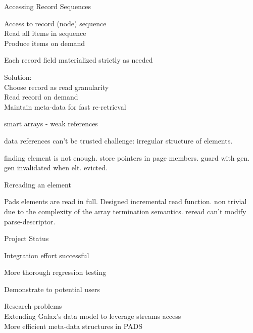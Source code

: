 \documentclass[landscape]{slides}
\begin{document}
\begin{Slide}{Accessing Record Sequences}

  \bb Access to record (node) sequence \\
  \bbb Read all items in sequence \\
  \bbb Produce items on demand

  \bb Each record field materialized strictly as needed

  \bb Solution: \\
  \bbb Choose record as read granularity \\
  \bbb Read record on demand \\
  \bbb Maintain meta-data for fast re-retrieval

\end{Slide}

\begin{Slide}{smart arrays - weak references}

  \bb data references can't be trusted
  \bb challenge: irregular structure of elements. 

    \bbb finding element is not enough.
    \bbb store pointers in page members.
    \bbb guard with gen.
    \bbb gen invalidated when elt. evicted.

\end{Slide}

\begin{Slide}{Rereading an element}

  \bb Pads elements are read in full.
  \bb Designed incremental read function.
  \bb non trivial due to the complexity of the array termination semantics.
  \bb reread can't modify parse-descriptor.

\end{Slide}

\begin{Slide}{Project Status}

\bb Integration effort successful 

\bb More thorough regression testing

\bb Demonstrate to potential users

\bb Research problems\\
\bbb Extending Galax's data model to leverage streams access\\
\bbb More efficient meta-data structures in PADS 

\end{Slide}
\end{document}

